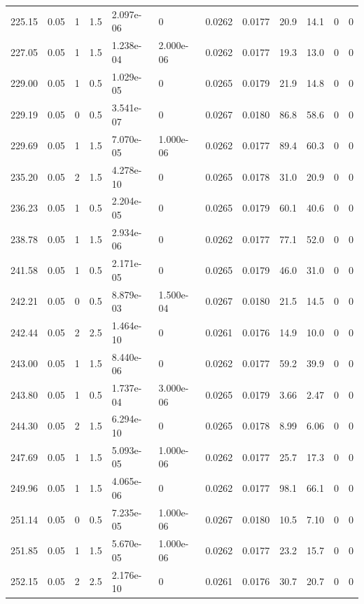\documentclass[preview]{standalone}
\begin{document}
{{{{\begin{tabular}{L{1.2cm}C{1.2cm} C{0.3cm}C{0.5cm} C{1.4cm}C{1.4cm} C{1.4cm}C{1.4cm} C{1.6cm}C{1.6cm} C{1.6cm}C{1.6cm}}
  225.15  &  0.05  & 1     & 1.5 &  2.097e-06  & 0  &  0.0262&   0.0177& 20.9 & 14.1   &  0 & 0  \\ 
  227.05  &  0.05  & 1     & 1.5 &  1.238e-04  & 2.000e-06  &  0.0262&   0.0177& 19.3 & 13.0   &  0 & 0  \\ 
  229.00  &  0.05  & 1     & 0.5 &  1.029e-05  & 0  &  0.0265&   0.0179& 21.9 & 14.8   &  0 & 0  \\ 
  229.19  &  0.05  & 0     & 0.5 &  3.541e-07  & 0  &  0.0267&   0.0180& 86.8 & 58.6   &  0 & 0  \\ 
  229.69  &  0.05  & 1     & 1.5 &  7.070e-05  & 1.000e-06  &  0.0262&   0.0177& 89.4 & 60.3   &  0 & 0  \\ 
  235.20  &  0.05  & 2     & 1.5 &  4.278e-10  & 0  &  0.0265&   0.0178& 31.0 & 20.9   &  0 & 0  \\ 
  236.23  &  0.05  & 1     & 0.5 &  2.204e-05  & 0  &  0.0265&   0.0179& 60.1 & 40.6   &  0 & 0  \\ 
  238.78  &  0.05  & 1     & 1.5 &  2.934e-06  & 0  &  0.0262&   0.0177& 77.1 & 52.0   &  0 & 0  \\ 
  241.58  &  0.05  & 1     & 0.5 &  2.171e-05  & 0  &  0.0265&   0.0179& 46.0 & 31.0   &  0 & 0  \\ 
  242.21  &  0.05  & 0     & 0.5 &  8.879e-03  & 1.500e-04  &  0.0267&   0.0180& 21.5 & 14.5   &  0 & 0  \\ 
  242.44  &  0.05  & 2     & 2.5 &  1.464e-10  & 0  &  0.0261&   0.0176& 14.9 & 10.0   &  0 & 0  \\ 
  243.00  &  0.05  & 1     & 1.5 &  8.440e-06  & 0  &  0.0262&   0.0177& 59.2 & 39.9   &  0 & 0  \\ 
  243.80  &  0.05  & 1     & 0.5 &  1.737e-04  & 3.000e-06  &  0.0265&   0.0179& 3.66 & 2.47   &  0 & 0  \\ 
  244.30  &  0.05  & 2     & 1.5 &  6.294e-10  & 0  &  0.0265&   0.0178& 8.99 & 6.06   &  0 & 0  \\ 
  247.69  &  0.05  & 1     & 1.5 &  5.093e-05  & 1.000e-06  &  0.0262&   0.0177& 25.7 & 17.3   &  0 & 0  \\ 
  249.96  &  0.05  & 1     & 1.5 &  4.065e-06  & 0  &  0.0262&   0.0177& 98.1 & 66.1   &  0 & 0  \\ 
  251.14  &  0.05  & 0     & 0.5 &  7.235e-05  & 1.000e-06  &  0.0267&   0.0180& 10.5 & 7.10   &  0 & 0  \\ 
  251.85  &  0.05  & 1     & 1.5 &  5.670e-05  & 1.000e-06  &  0.0262&   0.0177& 23.2 & 15.7   &  0 & 0  \\ 
  252.15  &  0.05  & 2     & 2.5 &  2.176e-10  & 0  &  0.0261&   0.0176& 30.7 & 20.7   &  0 & 0  \\ 

\end{tabular}}}}}
\end{document}
